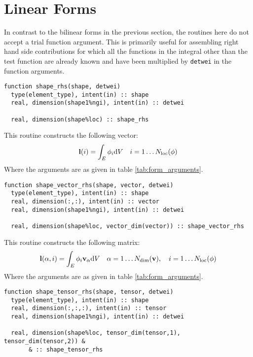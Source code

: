 \documentclass[a4paper, 11pt]{book}
\begin{document}
\section{Linear Forms}

In contrast to the bilinear forms in the previous section, the routines here
do not accept a trial function argument. This is primarily useful for
assembling right hand side contributions for which all the functions in the
integral other than the test function are already known and have been
multiplied by \lstinline+detwei+ in the function arguments.


\begin{lstlisting}
function shape_rhs(shape, detwei)
  type(element_type), intent(in) :: shape
  real, dimension(shape1%ngi), intent(in) :: detwei

  real, dimension(shape%loc) :: shape_rhs
\end{lstlisting}

This routine constructs the following vector:
\begin{equation}
  \mathbf{l}(i)=\int_E \phi_{i}\mathrm{d} V\quad
  i=1\ldots N_\mathrm{loc}(\phi)
\end{equation}
Where the arguments are as given in table \ref{tab:form_arguments}. 



\begin{lstlisting}
function shape_vector_rhs(shape, vector, detwei)
  type(element_type), intent(in) :: shape
  real, dimension(:,:), intent(in) :: vector
  real, dimension(shape1%ngi), intent(in) :: detwei

  real, dimension(shape%loc, vector_dim(vector)) :: shape_vector_rhs
\end{lstlisting}

This routine constructs the following matrix:
\begin{equation}
  \mathbf{l}(\alpha, i)=\int_E \phi_{i}\mathbf{v}_\alpha\mathrm{d} V\quad
  \alpha=1\ldots N_\mathrm{dim}(\mathbf{v}),\quad i=1\ldots N_\mathrm{loc}(\phi)
\end{equation}
Where the arguments are as given in table \ref{tab:form_arguments}. 



\begin{lstlisting}
function shape_tensor_rhs(shape, tensor, detwei)
  type(element_type), intent(in) :: shape
  real, dimension(:,:,:), intent(in) :: tensor
  real, dimension(shape1%ngi), intent(in) :: detwei

  real, dimension(shape%loc, tensor_dim(tensor,1), tensor_dim(tensor,2)) &
       & :: shape_tensor_rhs
\end{lstlisting}
\end{document}
